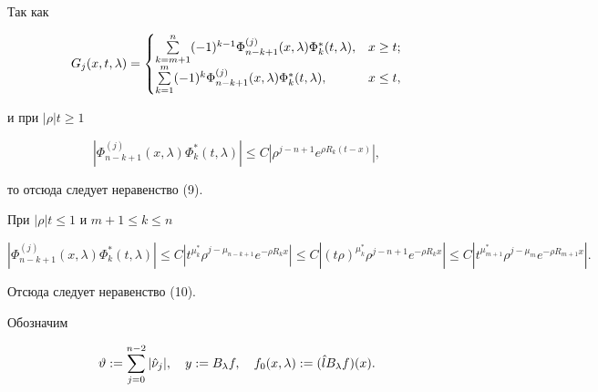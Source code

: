 \begin{pf}


Так как


$$


G_j(x,t,\lambda)=


\begin{cases}


\suml^n_{k=m+1}(-1)^{k-1}\Phi^{(j)}_{n-k+1}(x,\lambda)


\Phi^*_k(t,\lambda), & x\ge t;\\


\suml^m_{k=1}(-1)^k\Phi^{(j)}_{n-k+1}(x,\lambda)


\Phi^*_k(t,\lambda),& x\le t,


\end{cases}


$$


и при $|\rho|t\ge 1$


$$


|\Phi^{(j)}_{n-k+1}(x,\lambda)\Phi^*_k(t,\lambda)|\le


C|\rho^{j-n+1}e^{\rho R_k(t-x)}|,


$$


то отсюда следует неравенство (9).





При $|\rho|t\le 1$ и $m+1\le k\le n$


$$


|\Phi^{(j)}_{n-k+1}(x,\lambda)\Phi^*_k(t,\lambda)|\le


C|t^{\mu^*_k}\rho^{j-\mu_{n-k+1}}e^{-\rho R_k x}|\le 


C|(t\rho)^{\mu^*_k}\rho^{j-n+1}


e^{-\rho R_k x}|\le C|t^{\mu^*_{m+1}}


\rho^{j-\mu_m}e^{-\rho R_{m+1}x}|.


$$


Отсюда следует неравенство (10).


\end{pf}





Обозначим


$$


\vartheta:=\sum^{n-2}_{j=0}|\Hat \nu_j|,\quad y:=B_\lambda f,


\quad f_0(x,\lambda):=(\Hat l B_\lambda f)(x).


$$






